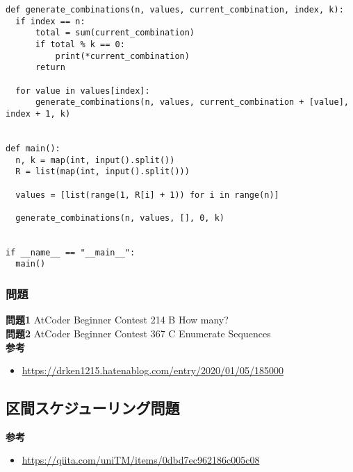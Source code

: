 \documentclass{jlreq}
\begin{document}
\begin{lstlisting}[caption=再帰関数を使った解法, label=recursive_ans, frame=TRBL]
def generate_combinations(n, values, current_combination, index, k):
  if index == n:
      total = sum(current_combination)
      if total % k == 0:
          print(*current_combination)
      return

  for value in values[index]:
      generate_combinations(n, values, current_combination + [value], index + 1, k)


def main():
  n, k = map(int, input().split())
  R = list(map(int, input().split()))

  values = [list(range(1, R[i] + 1)) for i in range(n)]

  generate_combinations(n, values, [], 0, k)


if __name__ == "__main__":
  main()
\end{lstlisting}

\subsubsection{問題}

\textbf{問題1} AtCoder Beginner Contest 214 B How many?\\
\textbf{問題2}  AtCoder Beginner Contest 367 C Enumerate Sequences \\




\textbf{参考}
\begin{itemize}
  \item \url{https://drken1215.hatenablog.com/entry/2020/01/05/185000}
\end{itemize}

\subsection{区間スケジューリング問題}
\textbf{参考}

\begin{itemize}
  \item \url{https://qiita.com/uniTM/items/0dbd7ec962186c005c08}
\end{itemize}
\end{document}
